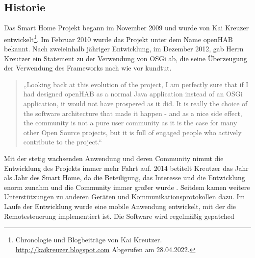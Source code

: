     \subsection*{Historie}
    \label{sec:historyoHAB}
    Das Smart Home Projekt begann im November 2009 und wurde von Kai Kreuzer entwickelt\footnote{Chronologie und Blogbeiträge von Kai Kreutzer. \url{http://kaikreuzer.blogspot.com} Abgerufen am 28.04.2022.}. 
    Im Februar 2010 wurde das Projekt unter dem Name openHAB bekannt. Nach zweieinhalb jähriger Entwicklung, im Dezember 2012, 
    gab Herrn Kreutzer ein Statement zu der Verwendung von OSGi ab, die seine Überzeugung der Verwendung des Frameworks nach wie 
    vor kundtut.
    \begin{quote}
        „Looking back at this evolution of the project, I am perfectly sure that if I had designed openHAB as a normal Java 
        application instead of an OSGi application, it would not have prospered as it did. It is really the choice of the 
        software architecture that made it happen - and as a nice side effect, the community is not a pure user community 
        as it is the case for many other Open Source projects, but it is full of engaged people who actively contribute to the 
        project.\cite{kaikreutzer2012}“
    \end{quote} 
    Mit der stetig wachsenden Anwendung und deren Community nimmt die Entwicklung des Projekts immer mehr Fahrt auf. 2014 betitelt 
    Kreutzer das Jahr als Jahr des Smart Home, da die Beteiligung, das Interesse und die Entwicklung enorm zunahm und die Community immer 
    großer wurde \cite{kaikreutzer2014}. Seitdem kamen weitere Unterstützungen zu anderen Geräten und 
    Kommunikationsprotokollen dazu. Im Laufe der Entwicklung wurde eine mobile Anwendung entwickelt, mit der die Remotesteuerung 
    implementiert ist. Die Software wird regelmäßig gepatched 

